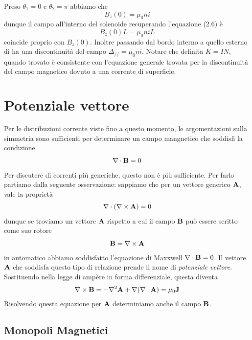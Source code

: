 Preso $\theta_1 = 0$ e $\theta_2 = \pi$ abbiamo che 
\begin{equation*}
	B_z(0) = \mu_0 ni
\end{equation*}
dunque il campo all'interno del solenoide recuperando l'equazione (2.6) \`e 
\begin{equation*}
	B_z(0)L = \mu_0niL
\end{equation*}
coincide proprio con $B_z(0)$. Inoltre passando dal bordo interno a quello esterno di ha una discontinuit\`a del campo $\Delta_{//} = \mu_0ni$. Notare che definita $K = IN$, quando trovato \`e consistente con l'equazione generale trovata per la discontinuit\`a del campo magnetico dovuto a una corrente di superficie.


\section{Potenziale vettore}

Per le distribuzioni corrente viste fino a questo momento, le argomentazioni sulla simmetria sono sufficienti per determinare un campo mangnetico che soddisfi la condizione 
\begin{equation*}
	\nabla \cdot \bold{B} = 0
\end{equation*}
Per discutere di correnti pi\`u generiche, questo non \`e pi\`u sufficiente. Per farlo partiamo dalla seguente osservazione: sappiamo che per un vettore generico $\bold{A}$, vale la propriet\`a 
\begin{equation*}
	\nabla \cdot (\nabla \times \bold{A}) =0
\end{equation*}
dunque se troviamo un vettore $\bold{A}$ rispetto a cui il campo $\bold{B}$ pu\`o essere scritto come suo rotore
\begin{equation*}
	\bold{B} = \nabla \times \bold{A}
\end{equation*}
in automatico abbiamo soddisfatto l'equazione di Maxxwell $\nabla \cdot \bold{B} = 0$. Il vettore $\bold{A}$ che soddisfa questo tipo di relazione prende il nome di \textit{potenziale vettore}. Sostituendo nella legge di amp\`ere in forma differenziale, questa diventa
\begin{equation}
	\nabla \times \bold{B} = - \nabla^2\bold{A} + \nabla(\nabla \cdot \bold{A}) = \mu_0 \bold{J}
\end{equation}
Risolvendo questa equazione per $\bold{A}$ determiniamo anche il campo $\bold{B}$.

\subsection{Monopoli Magnetici}

